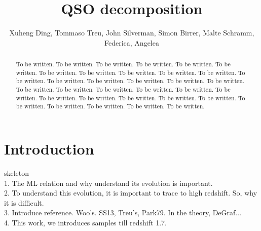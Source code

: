 \documentclass[apj]{emulateapj}
\begin{document}
\def\lcdm{$\Lambda$CDM}
\def\hst{{\it HST}}
\def\efr{$R_{\mathrm{eff}}$}
\def\galfit{\sc Galfit}
\def\mbh{$\mathcal M_{\rm BH}$}
\def\lhost{$L_{\rm host}$}
\def\jcap{Journal of Cosmology and Astroparticle Physics}
\def\halpha{${\it H}\alpha$}
\def\hbeta{${\it H}\beta$}
\def\sersic{S\'ersic}
\def\lenstronomy{{\sc Lenstronomy}}
\def\Reff{{$R_{\mathrm{eff}}$}}
\def\kms{km~s$^{\rm -1}$}


\title{QSO decomposition}

\author{Xuheng Ding, Tommaso Treu, John Silverman, Simon Birrer, Malte Schramm, Federica, Angelea
 }


\begin{abstract}
To be written. To be written. To be written. To be written. To be written. To be written. To be written. To be written. To be written. To be written. To be written. To be written. To be written. To be written. To be written. To be written. To be written. To be written. To be written. To be written. To be written. To be written. To be written. To be written. To be written. To be written. To be written. To be written. To be written. To be written. To be written. To be written. To be written. 
\end{abstract}


\section{Introduction}
\label{sec:introduction}
skeleton
\\
1. The ML relation and why understand its evolution is important.\\
2. To understand this evolution, it is important to trace to high redshift. So, why it is difficult.\\
3. Introduce reference. Woo's. SS13, Treu's, Park79. In the theory, DeGraf...\\
4. This work, we introduces samples till redshift 1.7.
\end{document}

